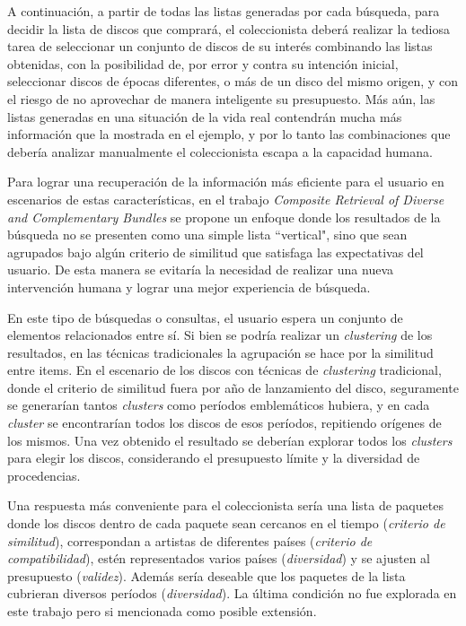 A continuación, a partir de todas las listas generadas por cada búsqueda, para decidir la lista de discos que comprará, el coleccionista deberá realizar la tediosa tarea de seleccionar un conjunto de discos de su interés combinando las listas obtenidas, con la posibilidad de, por error y contra su intención inicial, seleccionar discos de  épocas diferentes, o más de un disco del mismo origen, y con el riesgo de no aprovechar de manera inteligente su presupuesto. Más aún, las listas generadas en una situación de la vida real contendrán mucha más información que la mostrada en el ejemplo, y por lo tanto las combinaciones que debería analizar manualmente el coleccionista escapa a la capacidad humana. 

Para lograr una recuperación de la información más eficiente para el usuario en escenarios de estas características, en el trabajo {\em Composite Retrieval of Diverse and Complementary Bundles} \cite{compositeRetrival} se propone un enfoque donde los resultados de la búsqueda no se presenten como una simple lista ``vertical", sino que sean agrupados bajo algún criterio de similitud que satisfaga las expectativas del usuario. De esta manera se evitaría la necesidad de realizar una nueva intervención humana y lograr una mejor experiencia de búsqueda.

En este tipo de búsquedas o consultas, el usuario espera un conjunto de elementos relacionados entre sí. Si bien se podría realizar un {\em clustering} de los resultados, en las técnicas tradicionales la agrupación se hace por la similitud entre items. En el escenario de los discos con técnicas de {\em clustering} tradicional, donde el criterio de similitud fuera por año de lanzamiento del disco, seguramente se generarían tantos {\em clusters} como períodos emblemáticos hubiera, y en cada {\em cluster} se encontrarían todos los discos de esos períodos, repitiendo orígenes de los mismos. Una vez obtenido el resultado se deberían explorar todos los {\em clusters} para elegir los discos, considerando el presupuesto límite y la diversidad de procedencias.

Una respuesta más conveniente para el coleccionista sería una lista de paquetes donde los discos dentro de cada paquete sean cercanos en el tiempo ({\em criterio de similitud}), correspondan a artistas de diferentes países ({\em criterio de compatibilidad}), estén representados varios países ({\em diversidad}) y se ajusten al presupuesto ({\em validez}). Además sería deseable que los paquetes de la lista cubrieran diversos períodos ({\em diversidad}). La última condición no fue explorada en este trabajo pero si mencionada como posible extensión.


